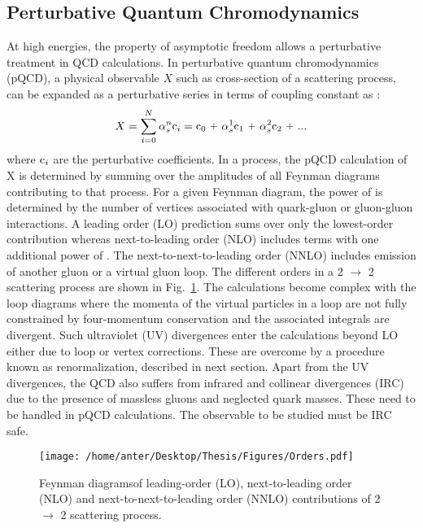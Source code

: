 \subsection{Perturbative Quantum Chromodynamics}
At high energies, the property of asymptotic freedom allows a perturbative treatment in QCD calculations. In perturbative quantum chromodynamics (pQCD), a physical observable $X$ such as cross-section of a scattering process, can be expanded as a perturbative series in terms of coupling constant \alps as : 
\begin{equation}
\label{eq:pertur}
X = \sum\limits_{i=0}^{N} \alpha^n_s {\rm c}_i = {\rm c}_0~\plus \alpha^1_s {\rm c}_1~\plus \alpha^2_s {\rm c}_2~\plus ...
\end{equation} 
where ${\rm c}_i$ are the perturbative coefficients. In a process, the pQCD calculation of X is determined by summing over the amplitudes of all Feynman diagrams contributing to that process. For a given Feynman diagram, the power of \alps is determined by the number of vertices associated with quark-gluon or gluon-gluon interactions. A leading order (LO) prediction sums over only the lowest-order contribution whereas next-to-leading order (NLO) includes terms with one additional power of \alps. The next-to-next-to-leading order (NNLO) includes emission of another gluon or a virtual gluon loop. The different orders in a 2 $\rightarrow$ 2 scattering process are shown in Fig.~\ref{fig:orders}. The calculations become complex with the loop diagrams where the momenta of the virtual particles in a loop are not fully constrained by four-momentum conservation and the associated integrals are divergent. Such ultraviolet (UV) divergences enter the calculations beyond LO either due to loop or vertex corrections. These are overcome by a procedure known as renormalization, described in next section. Apart from the UV divergences, the QCD also suffers from infrared and collinear divergences (IRC) due to the presence of massless gluons and neglected quark masses. These need to be handled in pQCD calculations. The observable to be studied must be IRC safe. 

\begin{figure}[!h]
\begin{center}
\vspace*{2mm}
\hspace*{-8mm}
\texttt{[image: /home/anter/Desktop/Thesis/Figures/Orders.pdf]}\\
\vspace*{4mm}
\caption[Feynman diagrams of leading-order (LO), next-to-leading order (NLO) and next-to-next-to-leading order (NNLO) processes in quantum chromodynamics.]{Feynman diagrams\footnotemark of leading-order (LO), next-to-leading order (NLO) and next-to-next-to-leading order (NNLO) contributions of 2 $\rightarrow$ 2 scattering process.}%
\label{fig:orders}
\end{center}
\end{figure}

